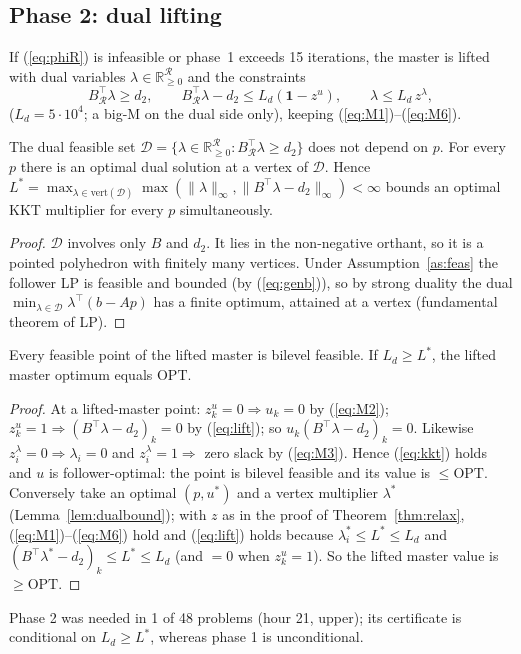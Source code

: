 \subsection{Phase 2: dual lifting}
If (\ref{eq:phiR}) is infeasible or phase~1 exceeds 15 iterations, the master is lifted
with dual variables $\lambda\in\mathbb R^{\mathcal R}_{\ge0}$ and the constraints
\begin{equation}
B_{\mathcal R}^\top\lambda\ge d_2,\qquad B_{\mathcal R}^\top\lambda-d_2\le L_d(\mathbf 1-z^u),\qquad
\lambda\le L_d\,z^\lambda,
\label{eq:lift}
\end{equation}
($L_d=5\cdot10^4$; a big-M on the dual side only), keeping (\ref{eq:M1})--(\ref{eq:M6}).

\begin{lemma}\label{lem:dualbound}
The dual feasible set $\mathcal D=\{\lambda\in\mathbb R^{\mathcal R}_{\ge0}:B_{\mathcal R}^\top\lambda\ge d_2\}$
does not depend on $p$. For every $p$ there is an optimal dual solution at a vertex of
$\mathcal D$. Hence $L^\ast=\max_{\lambda\in\mathrm{vert}(\mathcal D)}\max(\|\lambda\|_\infty,\|B^\top\lambda-d_2\|_\infty)<\infty$
bounds an optimal KKT multiplier for every $p$ simultaneously.
\end{lemma}
\begin{proof}
$\mathcal D$ involves only $B$ and $d_2$. It lies in the non-negative orthant, so it is a
pointed polyhedron with finitely many vertices. Under Assumption~\ref{as:feas} the
follower LP is feasible and bounded (by (\ref{eq:genb})), so by strong duality the dual
$\min_{\lambda\in\mathcal D}\lambda^\top(b-Ap)$ has a finite optimum, attained at a vertex
(fundamental theorem of LP).
\end{proof}
\begin{theorem}\label{thm:phase2}
Every feasible point of the lifted master is bilevel feasible. If $L_d\ge L^\ast$, the
lifted master optimum equals $\mathrm{OPT}$.
\end{theorem}
\begin{proof}
At a lifted-master point: $z^u_k=0\Rightarrow u_k=0$ by (\ref{eq:M2}); $z^u_k=1\Rightarrow
(B^\top\lambda-d_2)_k=0$ by (\ref{eq:lift}); so $u_k(B^\top\lambda-d_2)_k=0$. Likewise
$z^\lambda_i=0\Rightarrow\lambda_i=0$ and $z^\lambda_i=1\Rightarrow$ zero slack by (\ref{eq:M3}). Hence (\ref{eq:kkt})
holds and $u$ is follower-optimal: the point is bilevel feasible and its value is
$\le\mathrm{OPT}$. Conversely take an optimal $(p,u^\ast)$ and a vertex multiplier $\lambda^\ast$
(Lemma~\ref{lem:dualbound}); with $z$ as in the proof of Theorem~\ref{thm:relax},
(\ref{eq:M1})--(\ref{eq:M6}) hold and (\ref{eq:lift}) holds because
$\lambda^\ast_i\le L^\ast\le L_d$ and $(B^\top\lambda^\ast-d_2)_k\le L^\ast\le L_d$ (and $=0$ when $z^u_k=1$).
So the lifted master value is $\ge\mathrm{OPT}$.
\end{proof}
Phase 2 was needed in 1 of 48 problems (hour 21, upper); its certificate is conditional on
$L_d\ge L^\ast$, whereas phase 1 is unconditional.

